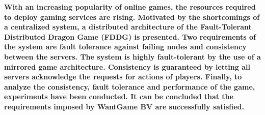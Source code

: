 \textbf{With an increasing popularity of online games, the resources required to deploy gaming services are rising.
	Motivated by the shortcomings of a centralized system, a distributed architecture of the Fault-Tolerant Distributed Dragon Game (FDDG) is presented. 
	Two requirements of the system are fault tolerance against failing nodes and consistency between the servers.
	The system is highly fault-tolerant by the use of a mirrored game architecture. 
	Consistency is guaranteed by letting all servers acknowledge the requests for actions of players. 
	Finally, to analyze the consistency, fault tolerance and performance of the game, experiments have been conducted. 
	It can be concluded that the requirements imposed by WantGame BV are successfully satisfied.}